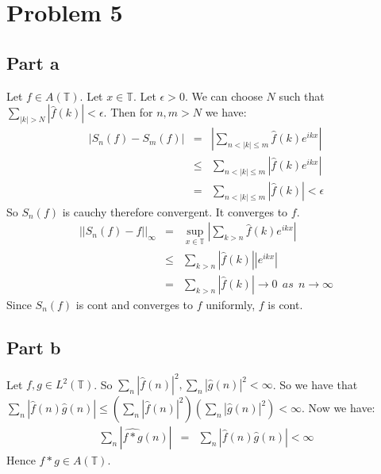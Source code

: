 \documentclass[12pt]{article}
\begin{document}
\clearpage
\section*{Problem 5}
\subsection*{Part a}
Let $f \in A(\mathbb{T})$.
Let $x \in \mathbb{T}$. Let $\epsilon >0$. We can choose $N$ such that
$\sum_{|k|>N} |\hat{f}(k)|< \epsilon$. Then for $n,m > N$ we have:
\begin{eqnarray*}
|S_n(f)-S_m(f)| &=& |\sum_{n < |k| \le m} \hat{f}(k)e^{ikx}| \\ &\le &
\sum_{n < |k| \le m} |\hat{f}(k)e^{ikx}| \\ &=&
\sum_{n < |k| \le m} |\hat{f}(k)| < \epsilon
\end{eqnarray*}
So $S_n(f)$ is cauchy therefore convergent. It converges to $f$.
\begin{eqnarray*}
||S_n(f)-f||_{\infty} &=& \sup_{x \in \mathbb{T}}|\sum_{k>n} \hat{f}(k)e^{ikx}| 
\\ &\le &
\sum_{k>n} |\hat{f}(k)| |e^{ikx}| \\ &=&
\sum_{k>n} |\hat{f}(k)| \rightarrow 0  \ \ as \ \ n \rightarrow \infty
\end{eqnarray*}
Since $S_n(f)$ is cont and converges to $f$ uniformly, $f$ is cont.
\subsection*{Part b}
Let $f,g \in L^2(\mathbb{T})$. So $\sum_n |\hat{f}(n)|^2,\sum_n |\hat{g}(n)|^2 < \infty$. So we have that\\
$\sum_n |\hat{f}(n)\hat{g}(n)| \le (\sum_n |\hat{f}(n)|^2)
(\sum_n |\hat{g}(n)|^2) < \infty$. Now we have:
\begin{eqnarray*}
\sum_n |\hat{f*g}(n)| &=& \sum_n |\hat{f}(n)\hat{g}(n)| <  \infty
\end{eqnarray*}
Hence $f*g \in A(\mathbb{T})$.

\clearpage
\end{document}
